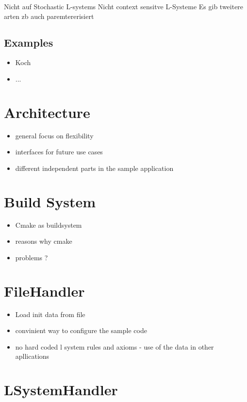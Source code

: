 \documentclass[english]{cpp-hmwk}
\begin{document}
Nicht auf Stochastic L-systems
Nicht context sensitve L-Systeme
Es gib tweitere arten zb auch paremtererisiert

\subsection{Examples}

\begin{itemize}
	\item Koch
	\item ...
\end{itemize}
  
  


  
\pagebreak
\section{Architecture}
\begin{itemize}
	\item general focus on flexibility
	\item interfaces for future use cases
	\item different independent parts in the sample application
\end{itemize}

\section{Build System}
\begin{itemize}
	\item Cmake as buildsystem
	\item reasons why cmake
	\item problems ?
\end{itemize}



\section{FileHandler}

\begin{itemize}
	\item Load init data from file
	\item convinient way to configure the sample code
	\item no hard coded l system rules and axioms - use of the data in other apllications
\end{itemize}

\section{LSystemHandler}
\end{document}
